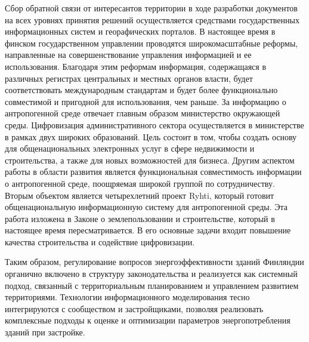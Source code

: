 Сбор обратной связи от интересантов территории в ходе разработки документов на всех уровнях принятия решений осуществляется средствами государственных информационных систем
и георафических порталов. В настоящее время в финском государственном управлении проводятся широкомасштабные реформы, направленные на совершенствование управления информацией
и ее использования. Благодаря этим реформам информация, содержащаяся в различных регистрах центральных и местных органов власти, будет соответствовать международным стандартам и
будет более функционально совместимой и пригодной для использования, чем раньше. За информацию о антропогенной среде отвечает главным образом министерство окружающей среды.
Цифровизация административного сектора осуществляется в министерстве в рамках двух широких образований.
Цель состоит в том, чтобы создать основу для общенациональных электронных услуг в сфере недвижимости и строительства, а также для новых возможностей для бизнеса.
Другим аспектом работы в области развития является функциональная совместимость информации о антропогенной среде, поощряемая широкой группой по сотрудничеству.
Вторым объектом является четырехлетний проект Ryhti, который готовит общенациональную информационную систему для антропогенной среды.
Эта работа изложена в Законе о землепользовании и строительстве, который в настоящее время пересматривается.
В его основные задачи входит повышение качества строительства и содействие цифровизации.


Таким образом, регулирование вопросов энергоэффективности зданий Финляндии органично включено в структуру законодательства и реализуется как системный подход,
связанный с территориальным планированием и управлением развитием территориями. Технологии информационного моделирования тесно интегрируются с сообществом и застройщиками,
позволяя реализовать комплексные подходы к оценке и оптимизации параметров энергопотребления зданий при застройке.



\subsection{\scAssesmentExp}

